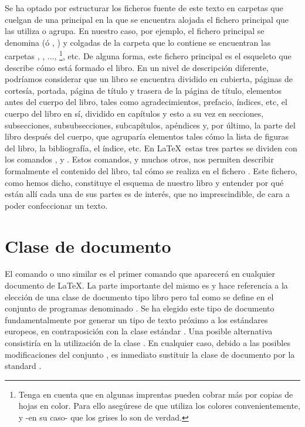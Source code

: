 Se ha optado por estructurar los ficheros fuente de este texto en carpetas que cuelgan de una principal en la que se
encuentra alojada el fichero principal que las utiliza o agrupa. En nuestro caso, por ejemplo, el fichero principal se
denomina  (ó , ) y colgadas de la carpeta
que lo contiene se encuentran las carpetas , , ...,
\footnote{Tenga en cuenta que en algunas imprentas pueden cobrar más por copias de hojas en
color. Para ello asegúrese de que utiliza los colores convenientemente, y -en su caso- que los grises lo son de
verdad.}, etc. De alguna forma, este fichero principal es el esqueleto que describe cómo está formado el libro. 
En un nivel de descripción diferente, podríamos considerar que un libro se encuentra dividido en cubierta, páginas de cortesía, portada, página de título y trasera de la página de título, elementos antes del cuerpo del libro, tales como agradecimientos, prefacio, índices, etc, el cuerpo del libro en sí, dividido en capítulos y esto a su vez en secciones, subsecciones, subsubsecciones, %
subcapítulos, apéndices y, por último, la parte del libro después del cuerpo, que agruparía elementos tales cómo la lista de figuras del libro, la bibliografía, el índice, etc. En \LaTeX\ estas tres partes se dividen con los comandos  ,  y . Estos comandos, y muchos otros, nos permiten describir formalmente el contenido del libro, tal cómo se realiza en el fichero . Este fichero, como hemos dicho, constituye el esquema de nuestro libro y entender por qué están allí cada una de sus partes es de interés, que no imprescindible, de cara a poder confeccionar un texto. 

\section{Clase de documento}
El comando  o uno similar es el primer comando que aparecerá en cualquier documento de \LaTeX. La parte importante del mismo es  y hace referencia a la elección de una  clase de documento tipo libro pero tal como se define en el conjunto de programas denominado . Se ha elegido este tipo de documento fundamentalmente por generar un tipo de texto próximo a los estándares europeos, en contraposición con la clase estándar . Una posible alternativa consistiría en la utilización de la clase . En cualquier caso, debido a las posibles modificaciones del conjunto , es inmediato sustituir la clase de documento por la standard .


